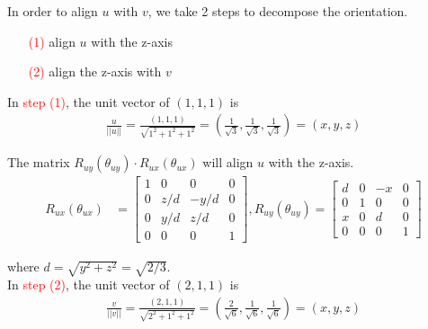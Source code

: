 \documentclass[11pt]{article}  %
\begin{document}
    \solution
    
    In order to align $u$ with $v$, we take 2 steps to decompose the orientation.
    \begin{enumerate}[leftmargin=12mm]
        \item[\textcolor{red}{(1)}] align $u$ with the z-axis
        \item[\textcolor{red}{(2)}] align the z-axis with $v$
    \end{enumerate}
    
    In \textcolor{red}{step (1)}, the unit vector of $(1,1,1)$ is
    \begin{align*}
        \frac{u}{||u||}=\frac{(1,1,1)}{\sqrt{1^2+1^2+1^2}}=(\frac{1}{\sqrt{3}},\frac{1}{\sqrt{3}},\frac{1}{\sqrt{3}})=(x,y,z)
    \end{align*}
    
    The matrix $R_{uy}(\theta _{uy}) \cdot R_{ux}(\theta _{ux})$ will align $u$ with the z-axis.
    \begin{align*}
        R_{ux}(\theta _{ux}) &= \begin{bmatrix}
            1 &   0   &   0   & 0\\
            0 &  z/d  & -y/d  & 0\\
            0 &  y/d  &  z/d  & 0\\
            0 &   0   &   0   & 1
        \end{bmatrix},
        R_{uy}(\theta _{uy}) = \begin{bmatrix}
            d   &   0   &  -x  & 0\\
            0   &   1   &   0  & 0\\
            x   &   0   &   d  & 0\\
            0   &   0   &   0  & 1
        \end{bmatrix}
    \end{align*}
    
    where $d=\sqrt{y^{2} + z^{2}} = \sqrt{2/3}$.\\
    
    In \textcolor{red}{step (2)}, the unit vector of $(2,1,1)$ is
    \begin{align*}
        \frac{v}{||v||}=\frac{(2,1,1)}{\sqrt{2^2+1^2+1^2}}=(\frac{2}{\sqrt{6}},\frac{1}{\sqrt{6}},\frac{1}{\sqrt{6}})=(x,y,z)
    \end{align*}
    
\end{document}
